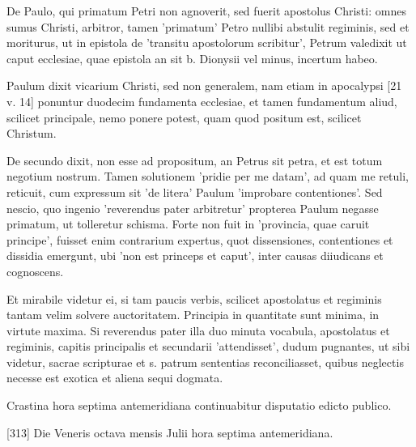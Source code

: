 De Paulo, qui primatum Petri non agnoverit, sed fuerit apostolus Christi: omnes sumus Christi, arbitror, tamen 'primatum' Petro nullibi abstulit regiminis, sed et moriturus, ut in epistola de 'transitu apostolorum scribitur', Petrum valedixit ut caput ecclesiae, quae epistola an sit b. Dionysii vel minus, incertum habeo.

Paulum dixit vicarium Christi, sed non generalem, nam etiam in apocalypsi [21 v. 14] ponuntur duodecim fundamenta ecclesiae, et tamen fundamentum aliud, scilicet principale, nemo ponere potest, quam quod positum est, scilicet Christum.

De secundo dixit, non esse ad propositum, an Petrus sit petra, et est totum negotium nostrum. Tamen solutionem 'pridie per me datam', ad quam me retuli, reticuit, cum expressum sit 'de litera' Paulum 'improbare contentiones'. Sed nescio, quo ingenio 'reverendus pater arbitretur' propterea Paulum negasse primatum, ut tolleretur schisma. Forte non fuit in 'provincia, quae caruit principe', fuisset enim contrarium expertus, quot dissensiones, contentiones et dissidia emergunt, ubi 'non est princeps et caput', inter causas diiudicans et cognoscens.

Et mirabile videtur ei, si tam paucis verbis, scilicet apostolatus et regiminis tantam velim solvere auctoritatem. Principia in quantitate sunt minima, in virtute maxima. Si reverendus pater illa duo minuta vocabula, apostolatus et regiminis, capitis principalis et secundarii 'attendisset', dudum pugnantes, ut sibi videtur, sacrae scripturae et s. patrum sententias reconciliasset, quibus neglectis necesse est exotica et aliena sequi dogmata.

Crastina hora septima antemeridiana continuabitur disputatio edicto publico.

[313] Die Veneris octava mensis Julii hora septima antemeridiana.

